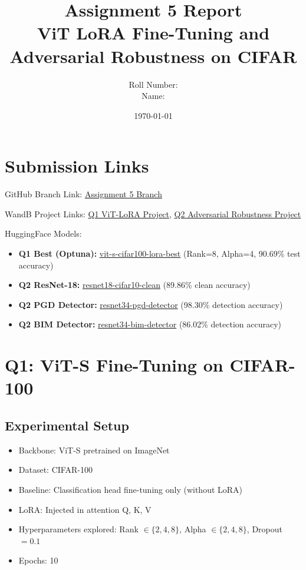 \documentclass[11pt,a4paper]{article}
\title{Assignment 5 Report\\
ViT LoRA Fine-Tuning and Adversarial Robustness on CIFAR}
\author{Roll Number: \underline{\hspace{3cm}} \\
Name: \underline{\hspace{5cm}}}
\date{\today}
\begin{document}
\maketitle

\section*{Submission Links}
GitHub Branch Link: \href{https://github.com/duckquack123/MLOps-Vasishth-M25CSA007/tree/assignment5}{Assignment 5 Branch}

WandB Project Links: 
\href{https://wandb.ai/YOUR_USERNAME/vit_cifar100_q1}{Q1 ViT-LoRA Project}, 
\href{https://wandb.ai/YOUR_USERNAME/adversarial_robustness_q2}{Q2 Adversarial Robustness Project}

HuggingFace Models:
\begin{itemize}
\item \textbf{Q1 Best (Optuna):} \href{https://huggingface.co/DuckyDuck123/vit-s-cifar100-lora-best}{vit-s-cifar100-lora-best} (Rank=8, Alpha=4, 90.69\% test accuracy)
\item \textbf{Q2 ResNet-18:} \href{https://huggingface.co/DuckyDuck123/resnet18-cifar10-clean}{resnet18-cifar10-clean} (89.86\% clean accuracy)
\item \textbf{Q2 PGD Detector:} \href{https://huggingface.co/DuckyDuck123/resnet34-pgd-detector}{resnet34-pgd-detector} (98.30\% detection accuracy)
\item \textbf{Q2 BIM Detector:} \href{https://huggingface.co/DuckyDuck123/resnet34-bim-detector}{resnet34-bim-detector} (86.02\% detection accuracy)
\end{itemize}

\section{Q1: ViT-S Fine-Tuning on CIFAR-100}

\subsection{Experimental Setup}
\begin{itemize}
\item Backbone: ViT-S pretrained on ImageNet
\item Dataset: CIFAR-100
\item Baseline: Classification head fine-tuning only (without LoRA)
\item LoRA: Injected in attention Q, K, V
\item Hyperparameters explored: Rank $\in \{2,4,8\}$, Alpha $\in \{2,4,8\}$, Dropout $=0.1$
\item Epochs: 10
\end{itemize}
\end{document}
